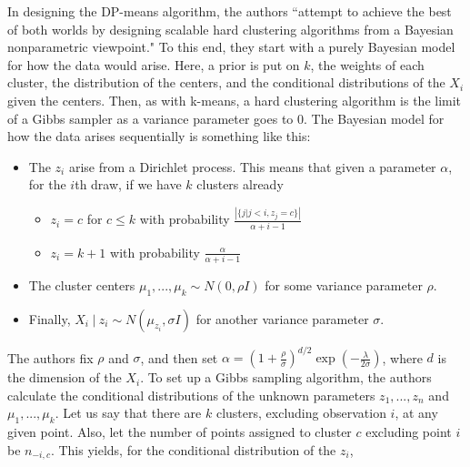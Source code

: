 \documentclass[11pt]{article}
\newcommand{\st}{ \; \big | \:}
\newcommand{\car}[1]{ \left\vert #1 \right\vert}
\theoremstyle{definition}
\begin{document}
In designing the DP-means algorithm, the authors ``attempt to achieve the best of both worlds by designing scalable hard clustering algorithms from a Bayesian nonparametric viewpoint." To this end, they start with a purely Bayesian model for how the data would arise. Here, a prior is put on $k$, the weights of each cluster, the distribution of the centers, and the conditional distributions of the $X_i$ given the centers. Then, as with k-means, a hard clustering algorithm is the limit of a Gibbs sampler as a variance parameter goes to 0. The Bayesian model for how the data arises sequentially is something like this: 
\begin{itemize}
    \item The $z_i$ arise from a Dirichlet process. This means that given a parameter $\alpha$, for the $i$th draw, if we have $k$ clusters already
        \begin{itemize}
            \item $z_i=c$ for $c\leq k$ with probability \(\frac{\car{\{ j\vert j<i, z_j=c\}}}{\alpha + i -1}\)
            \item $z_i=k+1$ with probability \(\frac{\alpha}{\alpha + i -1}\)
        \end{itemize}
    \item The cluster centers $\mu_1,...,\mu_k\sim N(0,\rho I)$ for some variance parameter $\rho$.
    \item Finally, \(X_i\st z_i \sim N(\mu_{z_i},\sigma I)\) for another variance parameter $\sigma$.
\end{itemize}
The authors fix $\rho$ and $\sigma$, and then set $\alpha=\left(1+\frac{\rho}{\sigma}\right)^{d/2}\exp\left(-\frac{\lambda}{2\sigma}\right)$, where $d$ is the dimension of the $X_i$. To set up a Gibbs sampling algorithm, the authors calculate the conditional distributions of the unknown parameters $z_1,...,z_n$ and $\mu_1,...,\mu_k$. Let us say that there are $k$ clusters, excluding observation $i$, at any given point. Also, let the number of points assigned to cluster $c$ excluding point $i$ be $n_{-i,c}$. This yields, for the conditional distribution of the $z_i$,
\end{document}

